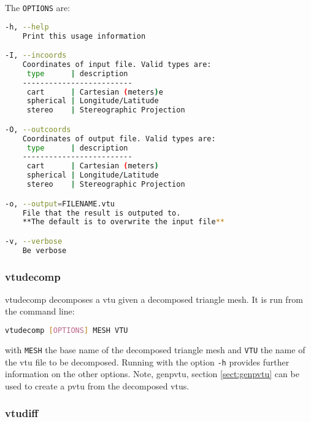 The \lstinline[language = Bash]+OPTIONS+ are:
\begin{lstlisting}[language = Bash]
-h, --help
	Print this usage information

-I, --incoords
	Coordinates of input file. Valid types are:
	 type      | description 
	-------------------------
	 cart      | Cartesian (meters)e
	 spherical | Longitude/Latitude
	 stereo    | Stereographic Projection

-O, --outcoords
	Coordinates of output file. Valid types are:
	 type      | description 
	-------------------------
	 cart      | Cartesian (meters)
	 spherical | Longitude/Latitude
	 stereo    | Stereographic Projection

-o, --output=FILENAME.vtu
	File that the result is outputed to. 
	**The default is to overwrite the input file**

-v, --verbose
	Be verbose

\end{lstlisting}


\subsubsection{vtudecomp}
\label{sect:vtudecomp}

vtudecomp decomposes a vtu given a decomposed triangle mesh. It is run from the command line:
\begin{lstlisting}[language = Bash]
vtudecomp [OPTIONS] MESH VTU
\end{lstlisting}
with \lstinline[language = Bash]+MESH+ the base name of the decomposed triangle mesh and \lstinline[language = Bash]+VTU+ the name of the vtu file to be decomposed. Running with the option \lstinline[language = Bash]+-h+ provides further information on the other options. Note, genpvtu, section \ref{sect:genpvtu} can be used to create a pvtu from the decomposed vtus.


\subsubsection{vtudiff}
\label{sect:vtudiff}

